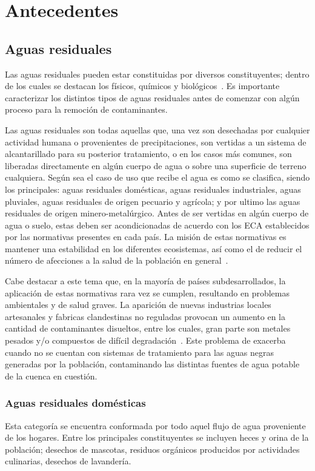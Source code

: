 \section{Antecedentes}
\subsection{Aguas residuales}
Las aguas residuales pueden estar constituidas por diversos constituyentes; dentro de los cuales se destacan los físicos, químicos y biológicos~\citep{crites2000}. Es importante caracterizar los distintos tipos de aguas residuales antes de comenzar con algún proceso para la remoción de contaminantes.\par
Las aguas residuales son todas aquellas que, una vez son desechadas por cualquier actividad humana o provenientes de precipitaciones, son vertidas a un sistema de alcantarillado para su posterior tratamiento, o en los casos más comunes, son liberadas directamente en algún cuerpo de agua o sobre una superficie de terreno cualquiera. Según sea el caso de uso que recibe el agua es como se clasifica, siendo los principales: aguas residuales domésticas, aguas residuales industriales, aguas pluviales, aguas residuales de origen pecuario y agrícola; y por ultimo las aguas residuales de origen minero-metalúrgico.
Antes de ser vertidas en algún cuerpo de agua o suelo, estas deben ser acondicionadas de acuerdo con los \gls{ECA} establecidos por las normativas presentes en cada país. La misión de estas normativas es mantener una estabilidad en los diferentes ecosistemas, así como el de reducir el número de afecciones a la salud de la población en general~\citep{lazcano2016,martinez1999}.\par
Cabe destacar a este tema que, en la mayoría de países subdesarrollados, la aplicación de estas normativas rara vez se cumplen, resultando en problemas ambientales y de salud graves. La aparición de nuevas industrias locales artesanales y fabricas clandestinas no reguladas provocan un aumento en la cantidad de contaminantes disueltos, entre los cuales, gran parte son metales pesados y/o compuestos de difícil degradación~\cite{metcalf2003}.
Este problema de exacerba cuando no se cuentan con sistemas de tratamiento para las aguas negras generadas por la población, contaminando las distintas fuentes de agua potable de la cuenca en cuestión.\par
\subsubsection*{Aguas residuales domésticas}
Esta categoría se encuentra conformada por todo aquel flujo de agua proveniente de los hogares. Entre los principales constituyentes se incluyen heces y orina de la población; desechos de mascotas, residuos orgánicos producidos por actividades culinarias, desechos de lavandería.

